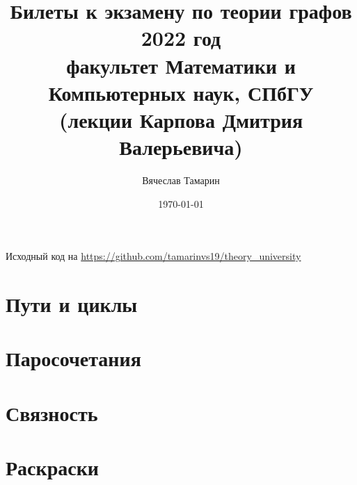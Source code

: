 \documentclass[11pt]{book}
\title{Билеты к экзамену по теории графов\\2022 год\\
    факультет Математики и Компьютерных наук, СПбГУ\\
(лекции Карпова Дмитрия Валерьевича)}
\date{\today}
\author{Вячеслав Тамарин}
\begin{document}
\maketitle
\tableofcontents
\hspace{1em}
\begin{center}
	Исходный код на \url{https://github.com/tamarinvs19/theory_university}
\end{center}
\chapter{Пути и циклы} 
 
 
 
 
 
 
\chapter{Паросочетания}
 
 
 
 
 
 
 
 
\chapter{Связность}
 
 
 
 
 
 

\chapter{Раскраски}

















\end{document}
